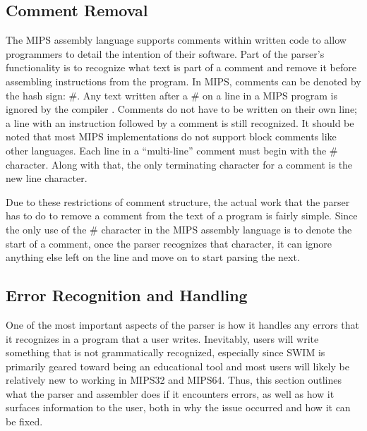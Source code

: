 \documentclass[
    paper=letter,
    parskip=half,
    fontsize=12pt,
    titlepage=firstiscover,
    toc=bibliography,
    numbers=endperiod
]{scrartcl}
\begin{document}
\subsection{Comment Removal}

The MIPS assembly language supports comments within written code to
allow programmers to detail the intention of their software. Part of the
parser's functionality is to recognize what text is part of a comment
and remove it before assembling instructions from the program. In MIPS,
comments can be denoted by the hash sign: \#. Any text written after a
\# on a line in a MIPS program is ignored by the compiler
\cite{wikibooks-mips-instructions}. Comments do not have to be written
on their own line; a line with an instruction followed by a comment is
still recognized. It should be noted that most MIPS implementations do
not support block comments like other languages. Each line in a
``multi-line'' comment must begin with the \# character. Along with
that, the only terminating character for a comment is the new line
character.

Due to these restrictions of comment structure, the actual work that the
parser has to do to remove a comment from the text of a program is
fairly simple. Since the only use of the \# character in the MIPS
assembly language is to denote the start of a comment, once the parser
recognizes that character, it can ignore anything else left on the line
and move on to start parsing the next.

\subsection{Error Recognition and Handling}

One of the most important aspects of the parser is how it handles any
errors that it recognizes in a program that a user writes. Inevitably,
users will write something that is not grammatically recognized,
especially since SWIM is primarily geared toward being an educational
tool and most users will likely be relatively new to working in MIPS32
and MIPS64. Thus, this section outlines what the parser and assembler
does if it encounters errors, as well as how it surfaces information to
the user, both in why the issue occurred and how it can be fixed.
\end{document}
